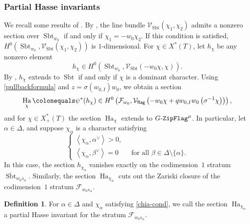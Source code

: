 \documentclass[10pt,a4paper]{article}
\numberwithin{equation}{section}
\theoremstyle{definition}
\newtheorem{definition}[theorem]{Definition}
\theoremstyle{remark}
\newcommand{\flag}{\mathsf{flag}}
\newcommand{\GF}{\mathop{\text{$G$-{\tt ZipFlag}}}\nolimits}
\newcommand{\Fcal}{{\mathcal F}}
\newcommand{\Vcal}{{\mathcal V}}
\DeclareMathOperator{\Sbt}{Sbt}
\DeclareMathOperator{\Ha}{Ha}
\begin{document}
\subsubsection{Partial Hasse invariants}\label{sec-partialHasse}
We recall some results of \cite{Imai-Koskivirta-partial-Hasse}. By \cite[Theorem 2.2.1(a)]{Goldring-Koskivirta-Strata-Hasse}, the line bundle $\Vcal_{\Sbt}(\chi_1,\chi_2)$ admits a nonzero section over $\Sbt_{w_0}$ if and only if $\chi_1=-w_0\chi_2$. If this condition is satisfied, $H^0(\Sbt_{w_0}, \Vcal_{\Sbt}(\chi_1,\chi_2))$ is $1$-dimensional. For $\chi\in X^*(T)$, let $h_\chi$ be any nonzero element
\begin{equation}\label{hchi}
  h_\chi\in H^0\left(\Sbt_{w_0}, \Vcal_{\Sbt}(-w_0\chi,\chi)\right).
\end{equation}
By \cite[Theorem 2.2.1(c)]{Goldring-Koskivirta-Strata-Hasse}, $h_\chi$ extends to $\Sbt$ if and only if $\chi$ is a dominant character. Using \eqref{pullbackformula} and $z=\sigma(w_{0,I})w_0$, we obtain a section
\begin{equation}
\Ha_{\chi}\colonequals \psi^*(h_\chi)\in H^0\left(\Fcal_{w_0},\Vcal_{\flag}\left(-w_0\chi+qw_{0,I}w_0\left(\sigma^{-1}\chi\right)\right)\right), 
\end{equation}
and for $\chi\in X^*_+(T)$ the section $\Ha_{\chi}$ extends to $\GF^\mu$. In particular, let $\alpha\in \Delta$, and suppose $\chi_{\alpha}$ is a character satisfying 
\begin{equation}\label{chia-cond}
\begin{cases}
\left\langle \chi_\alpha, \alpha^{\vee} \right\rangle>0, & \\
\left\langle \chi_\alpha, \beta^{\vee} \right\rangle=0 & \ \textrm{ for all } \beta\in \Delta\setminus \{\alpha\}.
\end{cases}
\end{equation}
In this case, the section $h_{\chi_\alpha}$ vanishes exactly on the codimension~$1$ stratum $\overline{\Sbt}_{w_0s_\alpha}$. Similarly, the section $\Ha_{\chi_{\alpha}}$ cuts out the Zariski closure of the codimension~$1$ stratum $\Fcal_{w_0s_\alpha}$.


\begin{definition}\label{partial-Hasse-def}
For $\alpha\in \Delta$ and $\chi_\alpha$ satisfying \eqref{chia-cond}, we call the section $\Ha_{\chi_{\alpha}}$ a partial Hasse invariant for the stratum $\Fcal_{w_0 s_\alpha}$.
\end{definition}
\end{document}
